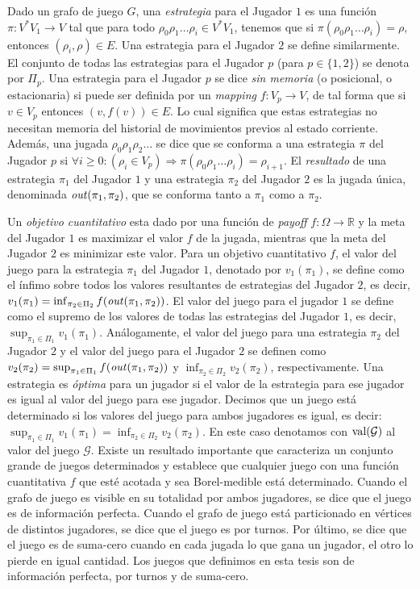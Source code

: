 Dado un grafo de juego $G$, una \emph{estrategia} para el Jugador $1$ es una función $\pi: V^{*} V_1 \rightarrow V$ tal que para todo  $\rho_0  \rho_1 \dots \rho_i \in V^{*} V_1$, tenemos que si $\pi(\rho_0  \rho_1\dots \rho_i) = \rho $, entonces $(\rho_i, \rho) \in E$. Una estrategia para el Jugador $2$ se define similarmente. El conjunto de todas las estrategias para el Jugador $p$ (para $p \in \{1,2\}$) se denota por $\Pi_{p}$.
Una estrategia para el Jugador $p$ se dice \emph{sin memoria} (o posicional, o estacionaria) si puede ser definida por un \textit{mapping} $f:V_p \rightarrow V$, de tal forma que si $v \in V_p$ entonces $(v, f(v)) \in E$.
Lo cual significa que estas estrategias no necesitan memoria del historial de movimientos previos al estado corriente. Además, una jugada $\rho_0 \rho_1 \rho_2 \dots$ se dice que se conforma a una estrategia $\pi$ del Jugador $p$ si $\forall i \geq 0: (\rho_i \in V_p) \Rightarrow  \pi(\rho_0 \rho_1 \dots \rho_i) = \rho_{i+1}$. El \emph{resultado} de una estrategia $\pi_{1}$ del Jugador $1$ y una estrategia $\pi_{2}$ del Jugador $2$ es la jugada única, denominada $\mathit{out}(\pi_1, \pi_2)$, que se conforma tanto a $\pi_1$ como a $\pi_2$.


Un \emph{objetivo cuantitativo} esta dado por una función de \textit{payoff} $f: \Omega \rightarrow \mathbb{R}$ y la meta del Jugador $1$ es maximizar el valor $f$ de la jugada, mientras que la meta del Jugador $2$ es minimizar este valor. Para un objetivo cuantitativo $f$, el valor del juego para la estrategia $\pi_1$ del Jugador $1$, denotado por $v_1(\pi_1)$, se define como el ínfimo sobre todos los valores resultantes de estrategias del Jugador $2$, es decir, $v_1(\pi_1) = \inf_{\pi_2 \in \Pi_2} f(\mathit{out}(\pi_1, \pi_2))$. El valor del juego para el jugador $1$ se define como el supremo de los valores de todas las estrategias del Jugador $1$, es decir, $\sup_{\pi_1 \in \Pi_1} v_1(\pi_1)$. Análogamente, el valor del juego para una estrategia $\pi_2$ del Jugador $2$ y el valor del juego para el Jugador $2$ se definen como $v_2(\pi_2) = \sup_{\pi_1 \in \Pi_1} f(\mathit{out}(\pi_1, \pi_2))$ 
y $\inf_{\pi_2 \in \Pi_2} v_2(\pi_2)$, respectivamente.
Una estrategia es \emph{óptima} para un jugador si el valor de la estrategia para ese jugador es igual al valor del juego para ese jugador. Decimos que un juego está determinado si los valores del juego para ambos jugadores es igual, es decir:
$\sup_{\pi_1 \in \Pi_1} v_1(\pi_1) = \inf_{\pi_2 \in \Pi_2} v_2(\pi_2)$. En este caso denotamos con $\mathop{\textup{val}}(\mathcal{G})$ al valor del juego $\mathcal{G}$.
Existe un resultado importante \cite{Martin98} que caracteriza un conjunto grande de juegos determinados y establece que cualquier juego con una función cuantitativa $f$ que esté acotada y sea Borel-medible está determinado.
Cuando el grafo de juego es visible en su totalidad por ambos jugadores, se dice que el juego es de información perfecta. Cuando el grafo de juego está particionado en vértices de distintos jugadores, se dice que el juego es por turnos.
Por último, se dice que el juego es de suma-cero cuando en cada jugada lo que gana un jugador, el otro lo pierde en igual cantidad. Los juegos que definimos en esta tesis son de información perfecta, por turnos y de suma-cero.

